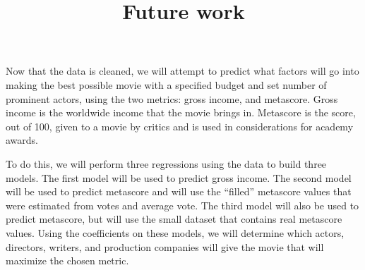 \documentclass{article}
\title{Future work}
\begin{document}
    \maketitle

    Now that the data is cleaned, we will attempt to predict what factors will go into making the best possible movie with a specified budget and set number of prominent actors, using the two metrics: gross income, and metascore.
    Gross income is the worldwide income that the movie brings in.
    Metascore is the score, out of 100, given to a movie by critics and is used in considerations for academy awards.

    To do this, we will perform three regressions using the data to build three models.
    The first model will be used to predict gross income.
    The second model will be used to predict metascore and will use the ``filled'' metascore values that were estimated from votes and average vote.
    The third model will also be used to predict metascore, but will use the small dataset that contains real metascore values.
    Using the coefficients on these models, we will determine which actors, directors, writers, and production companies will give the movie that will maximize the chosen metric.
\end{document}
